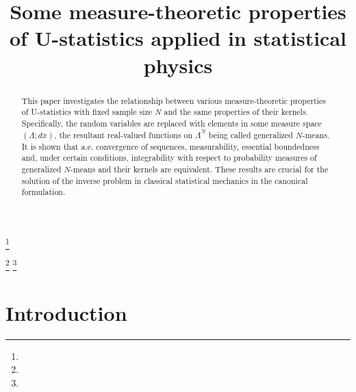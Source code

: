 \documentclass[12pt,leqno]{amsart}
\numberwithin{equation}{section}
\numberwithin{theor}{section}
\numberwithin{rem}{section}
\begin{document}
\title[]{Some measure-theoretic properties of U-statistics applied in statistical physics}
\author{}
\address{}
\email{}
\thanks{}
\author{}
\curraddr{}
\email{}
\thanks{}
\thanks{}

\begin{abstract}
This paper investigates the relationship between various measure-theoretic properties of U-statistics with fixed sample size $N$ and the same properties of their kernels.  Specifically, the random variables are replaced with elements in some 
measure space $(\Lambda; dx)$, the resultant real-valued functions on $\Lambda^N$ being called generalized $N$-means.  It is shown that  a.e. convergence of sequences, measurability, essential boundedness and, under certain conditions, integrability with respect to probability measures of generalized $N$-means and their kernels are equivalent.  These results are crucial for the solution of the inverse problem in classical statistical mechanics in the canonical formulation.  
\end{abstract}

\maketitle

\section{Introduction\label{intro}}
\end{document}
